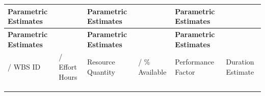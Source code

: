\documentclass[10pt,letterpaper]{article}
\renewcommand\arraystretch{1.25}
\begin{document}
\begin{center}
\begingroup
\setlength\tabcolsep{2.0pt}
\scriptsize
\renewcommand\arraystretch{1.55}
\begin{longtable}{|>{\raggedright\arraybackslash}p{0.995in}|>{\raggedright\arraybackslash}p{0.995in}|>{\raggedright\arraybackslash}p{0.995in}|>{\raggedright\arraybackslash}p{0.995in}|>{\raggedright\arraybackslash}p{0.995in}|>{\raggedright\arraybackslash}p{0.995in}|}
\hline
\rowcolor{light}
\textbf{Parametric Estimates} & \rule{0pt}{11pt}\hspace{0pt} & \textbf{Parametric Estimates} & \rule{0pt}{11pt}\hspace{0pt} & \textbf{Parametric Estimates} & \rule{0pt}{11pt}\hspace{0pt} \\ \hline
\endfirsthead
\hline\rowcolor{light} \textbf{Parametric Estimates} & \rule{0pt}{11pt}\hspace{0pt} & \textbf{Parametric Estimates} & \rule{0pt}{11pt}\hspace{0pt} & \textbf{Parametric Estimates} & \rule{0pt}{11pt}\hspace{0pt} \\ \hline
\endhead
/ WBS ID & / Effort Hours & Resource Quantity & / \% Available & Performance Factor & Duration Estimate \\ \hline
\rule{0pt}{11pt}\hspace{0pt} & \rule{0pt}{11pt}\hspace{0pt} & \rule{0pt}{11pt}\hspace{0pt} & \rule{0pt}{11pt}\hspace{0pt} & \rule{0pt}{11pt}\hspace{0pt} & \rule{0pt}{11pt}\hspace{0pt} \\ \hline
\rule{0pt}{11pt}\hspace{0pt} & \rule{0pt}{11pt}\hspace{0pt} & \rule{0pt}{11pt}\hspace{0pt} & \rule{0pt}{11pt}\hspace{0pt} & \rule{0pt}{11pt}\hspace{0pt} & \rule{0pt}{11pt}\hspace{0pt} \\ \hline
\rule{0pt}{11pt}\hspace{0pt} & \rule{0pt}{11pt}\hspace{0pt} & \rule{0pt}{11pt}\hspace{0pt} & \rule{0pt}{11pt}\hspace{0pt} & \rule{0pt}{11pt}\hspace{0pt} & \rule{0pt}{11pt}\hspace{0pt} \\ \hline

\end{longtable}
\end{center}
\end{document}
